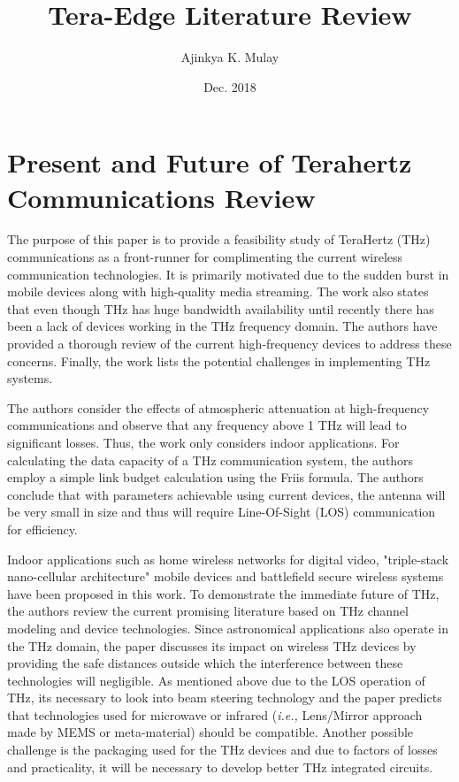 \documentclass[12pt, letterpaper]{article}
\title{Tera-Edge Literature Review}
\author{Ajinkya K. Mulay}
\date{Dec. 2018}
\begin{document}
	\begin{titlepage}
		\maketitle
	\end{titlepage}
	
	\section{Present and Future of Terahertz Communications Review \cite{song2011present}} 
\par
The purpose of this paper is to provide a feasibility study of TeraHertz (THz) communications as a front-runner for complimenting the current wireless communication technologies. It is primarily motivated due to the sudden burst in mobile devices along with high-quality media streaming. The work also states that even though THz has huge bandwidth availability until recently there has been a lack of devices working in the THz frequency domain. The authors have provided a thorough review of the current high-frequency devices to address these concerns. Finally, the work lists the potential challenges in implementing THz systems.
\par
The authors consider the effects of atmospheric attenuation at high-frequency communications and observe that any frequency above 1 THz will lead to significant losses.  Thus, the work only considers indoor applications. For calculating the data capacity of a THz communication system, the authors employ a simple link budget calculation using the Friis formula. The authors conclude that with parameters achievable using current devices, the antenna will be very small in size and thus will require Line-Of-Sight (LOS) communication for efficiency. 
\par
Indoor applications such as home wireless networks for digital video, "triple-stack nano-cellular architecture" mobile devices and battlefield secure wireless systems have been proposed in this work. To demonstrate the immediate future of THz, the authors review the current promising literature based on THz channel modeling and device technologies. Since astronomical applications also operate in the THz domain, the paper discusses its impact on wireless THz devices by providing the safe distances outside which the interference between these technologies will negligible. As mentioned above due to the LOS operation of THz, its necessary to look into beam steering technology and the paper predicts that technologies used for microwave or infrared (\emph{i.e.,} Lens/Mirror approach made by MEMS or meta-material) should be compatible. Another possible challenge is the packaging used for the THz devices and due to factors of losses and practicality, it will be necessary to develop better THz integrated circuits. 
\end{document}
